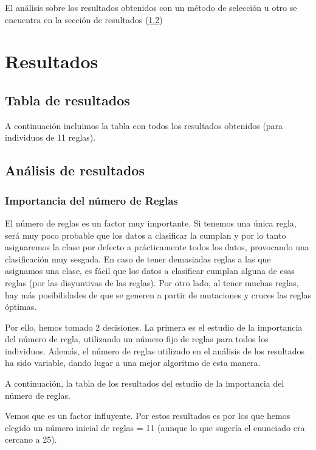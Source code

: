\documentclass[nochap]{apuntes}
\begin{document}
El análisis sobre los resultados obtenidos con un método de selección u otro se encuentra en la sección de resultados (\ref{sec:Resultados}) 


\chapter{Resultados}
\section{Tabla de resultados}

A continuación incluimos la tabla con todos los resultados obtenidos (para individuos de 11 reglas).





\section{Análisis de resultados}
\label{sec:Resultados}

\subsection{Importancia del número de Reglas}
\label{subsec:numReglas}

El número de reglas es un factor muy importante. Si tenemos una única regla, será muy poco probable que los datos a clasificar la cumplan y por lo tanto asignaremos la clase por defecto a prácticamente todos los datos, provocando una clasificación muy sesgada. En caso de tener demasiadas reglas a las que asignamos una clase, es fácil que los datos a clasificar cumplan alguna de esas reglas (por las disyuntivas de las reglas). Por otro lado, al tener muchas reglas, hay más posibilidades de que se generen a partir de mutaciones y cruces las reglas óptimas.

Por ello, hemos tomado 2 decisiones. La primera es el estudio de la importancia del número de regla, utilizando un número fijo de reglas para todos los individuos. Además, el número de reglas utilizado en el análisis de los resultados ha sido variable,  dando lugar a una mejor algoritmo de esta manera.

A continuación, la tabla de los resultados del estudio de la importancia del número de reglas.



Vemos que es un factor influyente. Por estos resultados es por los que hemos elegido un número inicial de reglas = 11 (aunque lo que sugería el enunciado era cercano a 25).
\end{document}
